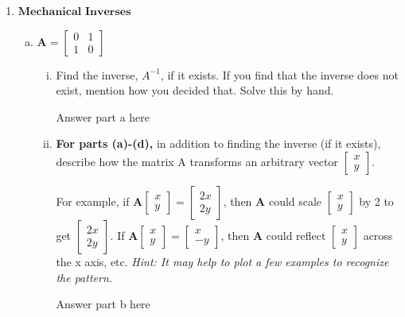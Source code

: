 \documentclass[11pt]{article}
\def\A{\textbf{A}} %
\begin{document}
\begin{enumerate}
	      \newpage
	\item $\textbf{Mechanical Inverses}$
	      \begin{enumerate}[(a)]
	      	\item $\A = \begin{bmatrix}
	      	      0 & 1 \\
	      	      1 & 0
	      	\end{bmatrix}$
	      	\begin{enumerate}[i.]
	      		\item Find the inverse, $A^{-1}$, if it exists. If you find that the inverse does not exist, mention how you decided that. Solve this by hand.
	      		      \begin{Answer}
	      		      	Answer part a here
	      		      \end{Answer}
	      		\item \textbf{For parts (a)-(d),} in addition to finding the inverse (if it exists), describe how the matrix A transforms an arbitrary vector $\begin{bmatrix}
	      		      x \\
	      		      y
	      		\end{bmatrix}$.
	      			      			      		                    
	      		For example, if $\A \begin{bmatrix}
	      		x \\
	      		y
	      		\end{bmatrix} = \begin{bmatrix}
	      		2x \\
	      		2y
	      		\end{bmatrix}$, then $\A$ could scale $\begin{bmatrix}
	      		x \\
	      		y
	      		\end{bmatrix}$ by 2 to get $\begin{bmatrix}
	      		2x \\
	      		2y
	      		\end{bmatrix}$. If $\A \begin{bmatrix}
	      		x \\
	      		y
	      		\end{bmatrix}
	      		=
	      		\begin{bmatrix}
	      			x  \\
	      			-y 
	      		\end{bmatrix}$, then $\A$ could reflect $\begin{bmatrix}
	      		x \\
	      		y
	      		\end{bmatrix}$ across the x axis, etc. \textit{Hint: It may help to plot a few examples to recognize the pattern.}
	      		\begin{Answer}
	      			Answer part b here
	      		\end{Answer}
	      	\end{enumerate}
	      		      		      	               

\end{enumerate}
\end{enumerate}
\end{document}
